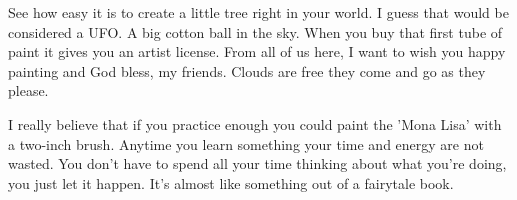 See how easy it is to create a little tree right in your world. I guess that would be considered a UFO. A big cotton ball in the sky. When you buy that first tube of paint it gives you an artist license. From all of us here, I want to wish you happy painting and God bless, my friends. Clouds are free they come and go as they please.

I really believe that if you practice enough you could paint the 'Mona Lisa' with a two-inch brush. Anytime you learn something your time and energy are not wasted. You don't have to spend all your time thinking about what you're doing, you just let it happen. It's almost like something out of a fairytale book.


